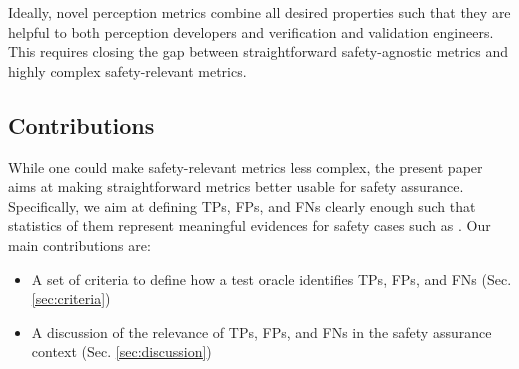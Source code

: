 \documentclass[conference]{IEEEtran}
\begin{document}
Ideally, novel perception metrics combine all desired properties such that they are helpful to both perception developers and verification and validation engineers. 
This requires closing the gap between straightforward safety-agnostic metrics and highly complex safety-relevant metrics. 

\subsection{Contributions}
\label{sec:introduction_contrib}
While one could make safety-relevant metrics less complex, the present paper aims at making straightforward metrics better usable for safety assurance. 
Specifically, we aim at defining TPs, FPs, and FNs clearly enough such that statistics of them represent meaningful evidences for safety cases such as \cite{Borg2022smirk}. 
Our main contributions are:
\begin{itemize}
\item A set of criteria to define how a test oracle identifies TPs, FPs, and FNs (Sec. \ref{sec:criteria})
\item A discussion of the relevance of TPs, FPs, and FNs in the safety assurance context (Sec. \ref{sec:discussion})
\end{itemize}





\end{document}
